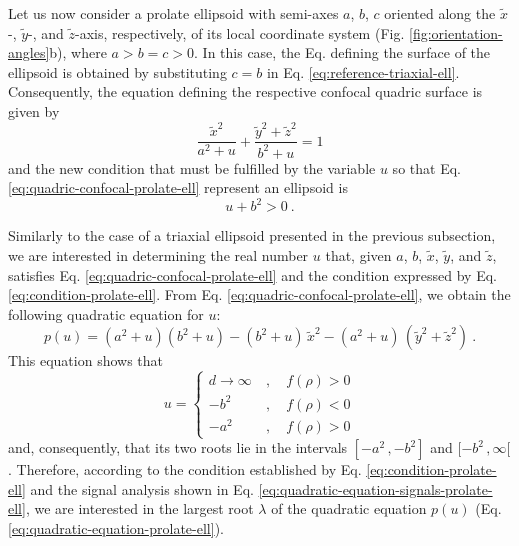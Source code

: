 \documentclass[gmd, manuscript]{copernicus}
\begin{document}
Let us now consider a prolate ellipsoid with semi-axes $a$, $b$,
$c$ oriented along the $\tilde{x}$-, $\tilde{y}$-, and
$\tilde{z}$-axis, respectively, of its local coordinate system
(Fig. \ref{fig:orientation-angles}b), where $a > b = c > 0$.
In this case, the Eq. defining the surface of the ellipsoid
is obtained by substituting $c = b$ in Eq. \ref{eq:reference-triaxial-ell}.
Consequently, the equation defining the respective confocal quadric
surface is given by
\begin{equation}
\frac{\tilde{x}^{2}}{a^{2} + u} + \frac{\tilde{y}^{2} + \tilde{z}^{2}}{b^{2} + u} = 1
\label{eq:quadric-confocal-prolate-ell}
\end{equation}
and the new condition that must be fulfilled by the variable
$u$ so that Eq. \ref{eq:quadric-confocal-prolate-ell}
represent an ellipsoid is
\begin{equation}
u + b^{2} > 0 \: .
\label{eq:condition-prolate-ell}
\end{equation}

Similarly to the case of a triaxial ellipsoid presented
in the previous subsection, we are interested in
determining the real number $u$ that,
given $a$, $b$, $\tilde{x}$, $\tilde{y}$, and $\tilde{z}$,
satisfies Eq. \ref{eq:quadric-confocal-prolate-ell} and
the condition expressed by Eq. \ref{eq:condition-prolate-ell}.
From Eq. \ref{eq:quadric-confocal-prolate-ell},
we obtain the following quadratic equation for $u$:
\begin{equation}
p(u) = (a^{2} + u)(b^{2} + u) - (b^{2} + u) \, \tilde{x}^{2}
- (a^{2} + u) \, (\tilde{y}^{2} + \tilde{z}^{2}) \: .
\label{eq:quadratic-equation-prolate-ell}
\end{equation}
This equation shows that
\begin{equation}
u = \begin{cases}
d \to \infty \: &, \quad f(\rho) > 0 \\
-b^{2} \: &, \quad f(\rho) < 0 \\
-a^{2} \: &, \quad f(\rho) > 0
\end{cases}
\label{eq:quadratic-equation-signals-prolate-ell}
\end{equation}
and, consequently, that its two roots lie in the intervals
$[ -a^{2} \, , -b^{2} ]$ and $[ -b^{2} \, , \infty [$.
Therefore, according to the condition established by
Eq. \ref{eq:condition-prolate-ell} and the signal analysis
shown in Eq. \ref{eq:quadratic-equation-signals-prolate-ell},
we are interested in the largest root $\lambda$ of the quadratic
equation $p(u)$ (Eq. \ref{eq:quadratic-equation-prolate-ell}).
\end{document}
